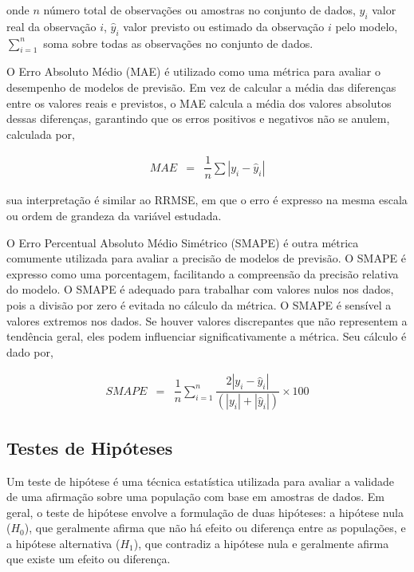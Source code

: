  \noindent onde $n$ número total de observações ou amostras no conjunto de dados,
 $y_i$ valor real da observação $i$,
 $\hat{y}_i$ valor previsto ou estimado da observação $i$ pelo modelo,
 $\sum_{i=1}^{n}$ soma sobre todas as observações no conjunto de dados.
 

O Erro Absoluto Médio (MAE) é utilizado como uma métrica para avaliar o desempenho de modelos de previsão. Em vez de calcular a média das diferenças entre os valores reais e previstos, o MAE calcula a média dos valores absolutos dessas diferenças, garantindo que os erros positivos e negativos não se anulem, calculada por,
 
 \begin{eqnarray}
 	M A E &=& \dfrac{1}{n} \sum\left|y_i-\hat{y}_i\right|\label{eq:mae}
 \end{eqnarray}
 
 \noindent sua interpretação é similar ao RRMSE, em que o erro é expresso na mesma escala ou ordem de grandeza da variável estudada.
 

 
O Erro Percentual Absoluto Médio Simétrico (SMAPE) é outra métrica comumente utilizada para avaliar a precisão de modelos de previsão. O SMAPE é expresso como uma porcentagem, facilitando a compreensão da precisão relativa do modelo. O SMAPE é adequado para trabalhar com valores nulos nos dados, pois a divisão por zero é evitada no cálculo da métrica. O SMAPE é sensível a valores extremos nos dados. Se houver valores discrepantes que não representem a tendência geral, eles podem influenciar significativamente a métrica. Seu cálculo é dado por,
  
 \begin{eqnarray}
 	SMAPE &=& \dfrac{1}{n} \sum_{i=1}^{n} \dfrac{2|y_i - \hat{y}_i|}{(|y_i| + |\hat{y}_i|)} \times 100\label{eq:smape}
 \end{eqnarray}
 

\subsection{Testes de Hip\'oteses}

Um teste de hipótese é uma técnica estatística utilizada para avaliar a validade de uma afirmação sobre uma população com base em amostras de dados. Em geral, o teste de hipótese envolve a formulação de duas hipóteses: a hipótese nula ($H_0$), que geralmente afirma que não há efeito ou diferença entre as populações, e a hipótese alternativa ($H_1$), que contradiz a hipótese nula e geralmente afirma que existe um efeito ou diferença.

